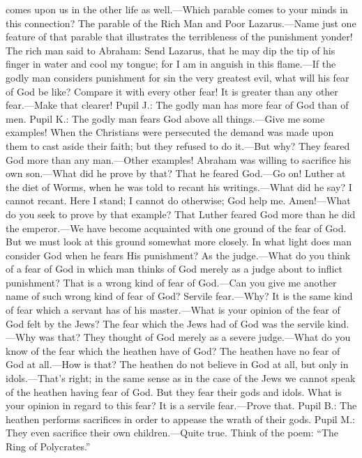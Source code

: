 comes upon us in the other life as well.—Which parable comes to your minds in this connection? The parable of the Rich Man and Poor Lazarus.—Name just one feature of that parable that illustrates the terribleness of the punishment yonder! The rich man said to Abraham: Send Lazarus, that he may dip the tip of his finger in water and cool my tongue; for I am in anguish in this flame.—If the godly man considers punishment for sin the very greatest evil, what will his fear of God be like? Compare it with every other fear! It is greater than any other fear.—Make that clearer! Pupil J.: The godly man has more fear of God than of men. Pupil K.: The godly man fears God above all things.—Give me some examples! When the Christians were persecuted the demand was made upon them to cast aside their faith; but they refused to do it.—But why? They feared God more than any man.—Other examples! Abraham was willing to sacrifice his own son.—What did he prove by that? That he feared God.—Go on! Luther at the diet of Worms, when he was told to recant his writings.—What did he say? I cannot recant. Here I stand; I cannot do otherwise; God help me. Amen!—What do you seek to prove by that example? That Luther feared God more than he did the emperor.—We have become acquainted with one ground of the fear of God. But we must look at this ground somewhat more closely. In what light does man consider God when he fears His punishment? As the judge.—What do you think of a fear of God in which man thinks of God merely as a judge about to inflict punishment? That is a wrong kind of fear of God.—Can you give me another name of such wrong kind of fear of God? Servile fear.—Why? It is the same kind of fear which a servant has of his master.—What is your opinion of the fear of God felt by the Jews? The fear which the Jews had of God was the servile kind.—Why was that? They thought of God merely as a severe judge.—What do you know of the fear which the heathen have of God? The heathen have no fear of God at all.—How is that? The heathen do not believe in God at all, but only in idols.—That's right; in the same sense as in the case of the Jews we cannot speak of the heathen having fear of God. But they fear their gods and idols. What is your opinion in regard to this fear? It is a servile fear.—Prove that. Pupil B.: The heathen performs sacrifices in order to appease the wrath of their gods. Pupil M.: They even sacrifice their own children.—Quite true. Think of the poem: “The Ring of Polycrates.”
